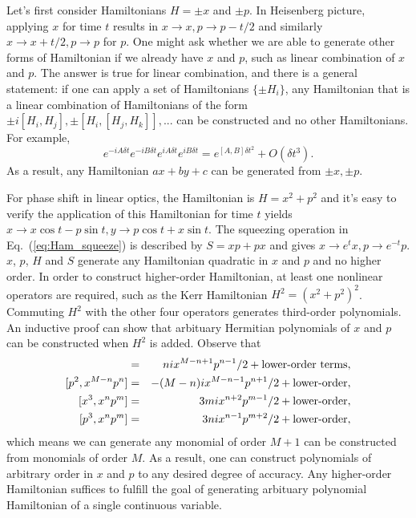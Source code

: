 \documentclass[%
 reprint,
groupedaddress,
showpacs,
 amsmath,amssymb,
 aps,
prb,
]{revtex4-1}
\begin{document}
		Let's first consider Hamiltonians $H=\pm x$ and $\pm p$. In Heisenberg picture, applying $x$ for time $t$ results in $x \rightarrow x, p \rightarrow p - t/2 $ and similarly $x\rightarrow x+t/2,p\rightarrow p $ for $p $. One might ask whether we are able to generate other forms of Hamiltonian if we already have $x$ and $p$, such as linear combination of $x$ and $p$. The answer is true for linear combination, and there is a general statement\cite{Deutsch669}: if one can apply a set of Hamiltonians $\{\pm H_i \} $, any Hamiltonian that is a linear combination of Hamiltonians of the form $\pm i[H_i,H_j],\pm[H_i,[H_j,H_k] ],... $ can be constructed and no other Hamiltonians. For example,
		\begin{equation}
		e^{-iA \delta t} e^{-i B \delta t} e^{i A \delta t} e^{ i B \delta t}=e^{[A,B] \delta t^2} + O(\delta t^3).
		\end{equation}
		As a result, any Hamiltonian $ax+by+c$ can be generated from $\pm x,\pm p$.

		For phase shift in linear optics, the Hamiltonian is $H = x^2 +p^2 $ and it's easy to verify the application of this Hamiltonian for time $t$ yields $x \rightarrow x\cos t -p\sin t, y\rightarrow p\cos t+x\sin t	$. The squeezing operation in Eq.~(\ref{eq:Ham_squeeze}) is described by $S = xp+px$ and gives $ x\rightarrow e^t x, p \rightarrow e^{-t} p $. $x$, $p$, $H$ and $S$ generate any Hamiltonian quadratic in $x$ and $p$ and no higher order. In order to construct higher-order Hamiltonian, at least one nonlinear operators are required, such as the Kerr Hamiltonian $H^2=(x^2+p^2)^2$. Commuting $H^2$ with the other four operators generates third-order polynomials. An inductive proof can show that arbituary Hermitian polynomials of $x$ and $p$ can be constructed when $H^2$ is added. Observe that
		\begin{eqnarray}
		[x^2, x^{M-n}p^n] &=& nix^{M-n+1} p^{n-1}/2 + \text{lower-order terms}, \notag\\
		{}[p^2,x^{M-n}p^n] &=& -(M-n)ix^{M-n-1}p^{n+1}/2 +\text{lower-order},\notag \\
		{}[x^3,x^np^m] &=& 3mix^{n+2}p^{m-1}/2 +\text{lower-order},\notag\\
		{}[p^3,x^np^m] &=& 3nix^{n-1}p^{m+2}/2 +\text{lower-order},\notag
		\end{eqnarray}
		which means we can generate any monomial of order $M+1$ can be constructed from monomials of order $M$. As a result, one can construct polynomials of arbitrary order in $x$ and $p$ to any desired degree of accuracy. Any higher-order Hamiltonian suffices to fulfill the goal of generating arbituary polynomial Hamiltonian of a single continuous variable.
\end{document}

